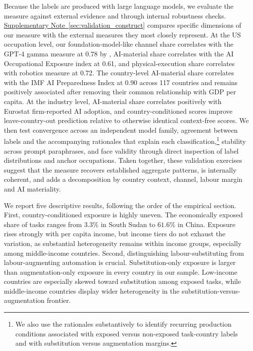 \documentclass[11pt]{article}
\begin{document}
Because the labels are produced with large language models, we evaluate the measure against external evidence and through internal robustness checks. \hyperref[sec:validation_construct]{Supplementary Note~\ref*{sec:validation_construct}} compares specific dimensions of our measure with the external measures they most closely represent. At the US occupation level, our foundation-model-like channel share correlates with the GPT-4 gamma measure at 0.78 by \citet{EloundouEtAl2024}, AI-material share correlates with the \citet{felten2021occupational} AI Occupational Exposure index at 0.61, and physical-execution share correlates with \citet{Webb2020} robotics measure at 0.72. The country-level AI-material share correlates with the IMF AI Preparedness Index \citep{CazzanigaEtAl2024GenAI} at 0.90 across 117 countries and remains positively associated after removing their common relationship with GDP per capita. At the industry level, AI-material share correlates positively with Eurostat firm-reported AI adoption, and country-conditioned scores improve leave-country-out prediction relative to otherwise identical context-free scores. We then test convergence across an independent model family, agreement between labels and the accompanying rationales that explain each classification,\footnote{We also use the rationales substantively to identify recurring production conditions associated with exposed versus non-exposed task-country labels and with substitution versus augmentation margins.} stability across prompt paraphrases, and face validity through direct inspection of label distributions and anchor occupations. Taken together, these validation exercises suggest that the measure recovers established aggregate patterns, is internally coherent, and adds a decomposition by country context, channel, labour margin and AI materiality.

We report five descriptive results, following the order of the empirical section. First, country-conditioned exposure is highly uneven. The economically exposed share of tasks ranges from $3.3\%$ in South Sudan to $61.6\%$ in China. Exposure rises strongly with per capita income, but income tiers do not exhaust the variation, as substantial heterogeneity remains within income groups, especially among middle-income countries. Second, distinguishing labour-substituting from labour-augmenting automation is crucial. Substitution-only exposure is larger than augmentation-only exposure in every country in our sample. Low-income countries are especially skewed toward substitution among exposed tasks, while middle-income countries display wider heterogeneity in the substitution-versus-augmentation frontier.
\end{document}
